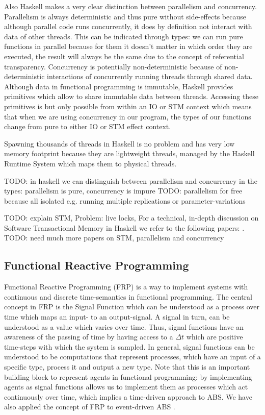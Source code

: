 Also Haskell makes a very clear distinction between parallelism and concurrency. Parallelism is always deterministic and thus pure without side-effects because although parallel code runs concurrently, it does by definition not interact with data of other threads. This can be indicated through types: we can run pure functions in parallel because for them it doesn't matter in which order they are executed, the result will always be the same due to the concept of referential transparency. Concurrency is potentially non-deterministic because of non-deterministic interactions of concurrently running threads through shared data. Although data in functional programming is immutable, Haskell provides primitives which allow to share immutable data between threads. Accessing these primitives is but only possible from within an IO or STM context which means that when we are using concurrency in our program, the types of our functions change from pure to either IO or STM effect context.

Spawning thousands of threads in Haskell is no problem and has very low memory footprint because they are lightweight threads, managed by the Haskell Runtime System which maps them to physical threads. 

TODO: in haskell we can distinguish between parallelism and concurrency in the types: parallelism is pure, concurrency is impure
TODO: parallelism for free because all isolated e.g. running multiple replications or parameter-variations

TODO: explain STM, Problem: live locks, For a technical, in-depth discussion on Software Transactional Memory in Haskell we refer to the following papers: \citep{harris_composable_2005, osullivan_real_2008}. TODO: need much more papers on STM, parallelism and concurrency

\subsection{Functional Reactive Programming}
\label{sec:frp}
Functional Reactive Programming (FRP) is a way to implement systems with continuous and discrete time-semantics in functional programming. The central concept in FRP is the Signal Function which can be understood as a process over time which maps an input- to an output-signal. A signal in turn, can be understood as a value
which varies over time. Thus, signal functions have an awareness of the passing of time by having access to a $\Delta t$ which are positive time-steps with which the system is sampled. In general, signal functions can be understood to be computations that represent processes, which have an input of a specific type, process it and output a new type. Note that this is an important building block to represent agents in functional programming: by implementing agents as signal functions allows us to implement them as processes which act continuously over time, which implies a time-driven approach to ABS. We have also applied the concept of FRP to event-driven ABS \citep{meyer_event-driven_2014}.

